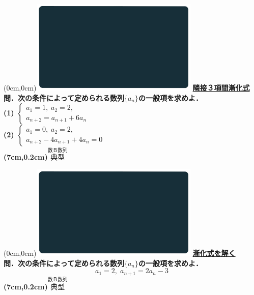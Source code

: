 \documentclass[10pt,
fleqn,
dvipdfmx,
uplatex
]{jsarticle}
\begin{document}
\newpage

\at(0cm,0cm){\includegraphics[width=8cm,bb=0 0 1920 1080]{./youtube/thumbnails/templates/smart_background/数B数列.jpeg}}
{\color{orange}\bf\boldmath\Large\underline{隣接３項間漸化式}}\vspace{0.3zw}\\
\normalsize 
\bf\boldmath 問．次の条件によって定められる数列$\{a_n\}$の一般項を求めよ．\\
(1)  $\left\{\begin{array}{l}a_1=1,\;a_2=2,\;\\a_{n+2}=a_{n+1}+6a_n\end{array}\right.$\\
(2)  $\left\{\begin{array}{l}a_1=0,\;a_2=2,\;\\a_{n+2}-4a_{n+1}+4a_n=0\end{array}\right.$\\

\at(7cm,0.2cm){\small\color{bradorange}$\overset{\text{数Ｂ数列}}{\text{典型}}$}

\newpage

\at(0cm,0cm){\includegraphics[width=8cm,bb=0 0 1920 1080]{./youtube/thumbnails/templates/smart_background/数B数列.jpeg}}
{\color{orange}\bf\boldmath\Large\underline{漸化式を解く}}\vspace{0.3zw}\\
\large 
\bf\boldmath 問．次の条件によって定められる数列$\{a_n\}$の一般項を求めよ．
\[a_1=2,\;a_{n+1}=2a_n-3\]
\at(7cm,0.2cm){\small\color{bradorange}$\overset{\text{数Ｂ数列}}{\text{典型}}$}
\end{document}
